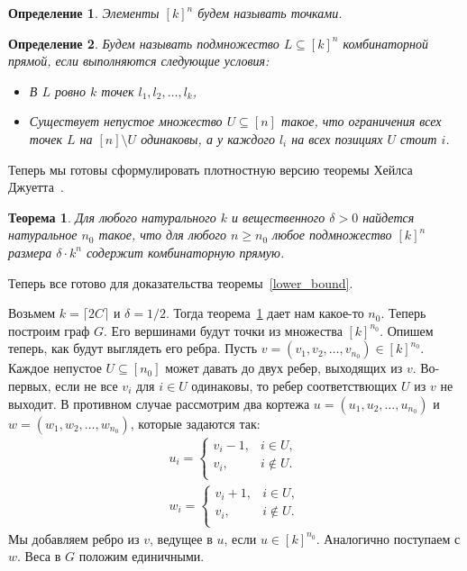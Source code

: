 \documentclass[12pt]{article}
\DeclareRobustCommand*{\CC}{\,\textendash\,\hskip 0pt}
\newtheorem{definition}{Определение}
\newtheorem{theorem}{Теорема}
\begin{document}
    \begin{definition}
        Элементы $[k]^n$ будем называть \emph{точками}.
    \end{definition}

    \begin{definition}
        Будем называть подмножество $L \subseteq [k]^n$ \emph{комбинаторной прямой},
        если выполняются следующие условия:
        \begin{itemize}
            \item В $L$ ровно $k$ точек $l_1, l_2, \ldots, l_k$,
            \item Существует непустое множество $U \subseteq [n]$ такое, что ограничения всех точек 
            $L$ на $[n] \setminus U$ одинаковы, а у каждого $l_i$ на всех позициях $U$ стоит $i$.
        \end{itemize}
    \end{definition}

    Теперь мы готовы сформулировать плотностную версию теоремы Хейлса\CC Джуетта~\cite{P09}.
    \begin{theorem}
        \label{density_hales_jewett}
        Для любого натурального $k$ и вещественного $\delta > 0$ найдется натуральное $n_0$ такое, что для
        любого $n \geq n_0$ любое подмножество $[k]^n$ размера $\delta \cdot k^n$ содержит комбинаторную
        прямую.
    \end{theorem}

    Теперь все готово для доказательства теоремы~\ref{lower_bound}.

    Возьмем $k = \lceil 2C \rceil$ и $\delta = 1/2$. Тогда теорема~\ref{density_hales_jewett}
    дает нам какое-то $n_0$. Теперь построим граф $G$. Его вершинами будут точки из множества
    $[k]^{n_0}$.
    Опишем теперь, как будут выглядеть его ребра. Пусть $v = (v_1, v_2, \ldots, v_{n_0}) \in [k]^{n_0}$.
    Каждое непустое $U \subseteq [n_0]$ может давать до двух ребер, выходящих из $v$.
    Во-первых, если не все $v_i$ для $i \in U$ одинаковы, то ребер соответствющих $U$ из $v$
    не выходит.
    В противном случае рассмотрим два кортежа
    $u = (u_1, u_2, \ldots, u_{n_0})$ и $w = (w_1, w_2, \ldots, w_{n_0})$,
    которые задаются так:
    \begin{eqnarray*}
        u_i = \begin{cases}
            v_i - 1, & i \in U,\\
            v_i, & i \notin U.\\
        \end{cases}\\
        w_i = \begin{cases}
            v_i + 1, & i \in U,\\
            v_i, & i \notin U.\\
        \end{cases}
    \end{eqnarray*}
    Мы добавляем ребро из $v$, ведущее в $u$, если $u \in [k]^{n_0}$. Аналогично поступаем с $w$.
    Веса в $G$ положим единичными.
\end{document}
